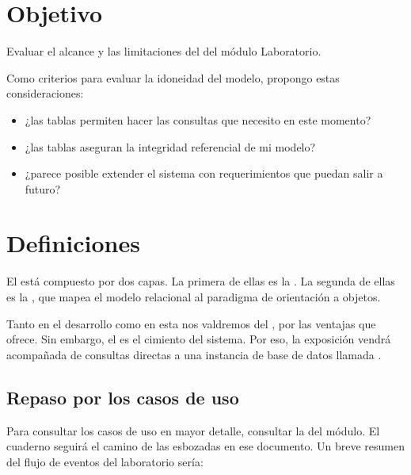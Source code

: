 \documentclass[letterpaper,10pt,spanish]{sphinxmanual}
\begin{document}
\section{Objetivo}
\label{\detokenize{requerimientos/laboratorio_aceptacion:objetivo}}
Evaluar el alcance y las limitaciones del  del módulo
Laboratorio.

Como criterios para evaluar la idoneidad del modelo, propongo estas
consideraciones:
\begin{itemize}
\item {} 
¿las tablas permiten hacer las consultas que necesito en este
momento?

\item {} 
¿las tablas aseguran la integridad referencial de mi modelo?

\item {} 
¿parece posible extender el sistema con requerimientos que puedan
salir a futuro?

\end{itemize}


\section{Definiciones}
\label{\detokenize{requerimientos/laboratorio_aceptacion:definiciones}}
El  está compuesto por dos capas. La primera de ellas es la
. La segunda de ellas es la
, que mapea el modelo relacional al paradigma de
orientación a objetos.

Tanto en el desarrollo como en esta  nos valdremos
del , por las ventajas que ofrece. Sin embargo, el  es el cimiento del sistema. Por eso, la exposición vendrá
acompañada de consultas directas a una instancia de base de datos
 llamada .


\subsection{Repaso por los casos de uso}
\label{\detokenize{requerimientos/laboratorio_aceptacion:repaso-por-los-casos-de-uso}}
Para consultar los casos de uso en mayor detalle, consultar la
 del módulo. El cuaderno seguirá el
camino de las  esbozadas en ese documento.
Un breve resumen del flujo de eventos del laboratorio sería:
\end{document}
